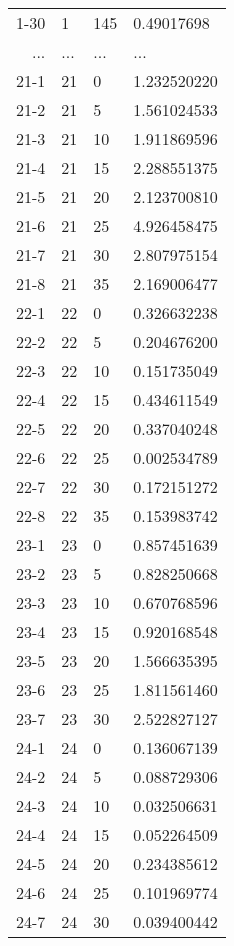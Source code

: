 \documentclass[11pt]{article}
\begin{document}
\begin{tabular}{r|lll}
	1-30 & 1          & 145        & 0.49017698\\
	... & ... & ... & ...\\
	21-1 & 21          &  0          & 1.232520220\\
	21-2 & 21          &  5          & 1.561024533\\
	21-3 & 21          & 10          & 1.911869596\\
	21-4 & 21          & 15          & 2.288551375\\
	21-5 & 21          & 20          & 2.123700810\\
	21-6 & 21          & 25          & 4.926458475\\
	21-7 & 21          & 30          & 2.807975154\\
	21-8 & 21          & 35          & 2.169006477\\
	22-1 & 22          &  0          & 0.326632238\\
	22-2 & 22          &  5          & 0.204676200\\
	22-3 & 22          & 10          & 0.151735049\\
	22-4 & 22          & 15          & 0.434611549\\
	22-5 & 22          & 20          & 0.337040248\\
	22-6 & 22          & 25          & 0.002534789\\
	22-7 & 22          & 30          & 0.172151272\\
	22-8 & 22          & 35          & 0.153983742\\
	23-1 & 23          &  0          & 0.857451639\\
	23-2 & 23          &  5          & 0.828250668\\
	23-3 & 23          & 10          & 0.670768596\\
	23-4 & 23          & 15          & 0.920168548\\
	23-5 & 23          & 20          & 1.566635395\\
	23-6 & 23          & 25          & 1.811561460\\
	23-7 & 23          & 30          & 2.522827127\\
	24-1 & 24          &  0          & 0.136067139\\
	24-2 & 24          &  5          & 0.088729306\\
	24-3 & 24          & 10          & 0.032506631\\
	24-4 & 24          & 15          & 0.052264509\\
	24-5 & 24          & 20          & 0.234385612\\
	24-6 & 24          & 25          & 0.101969774\\
	24-7 & 24          & 30          & 0.039400442\\
\end{tabular}
\end{document}
